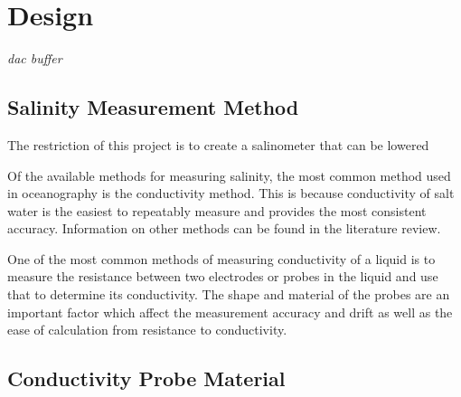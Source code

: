 
\chapter{Design}\label{ch:design}

\textit{dac buffer}

\section{Salinity Measurement Method}

The restriction of this project is to create a salinometer that can be lowered 

Of the available methods for measuring salinity, the most common method used in oceanography is the conductivity method.
This is because conductivity of salt water is the easiest to repeatably measure and provides the most consistent accuracy.
Information on other methods can be found in the literature review.

One of the most common methods of measuring conductivity of a liquid is to measure the resistance between two electrodes or probes in the liquid and use that to determine its conductivity.
The shape and material of the probes are an important factor which affect the measurement accuracy and drift as well as the ease of calculation from resistance to conductivity.

\section{Conductivity Probe Material}

